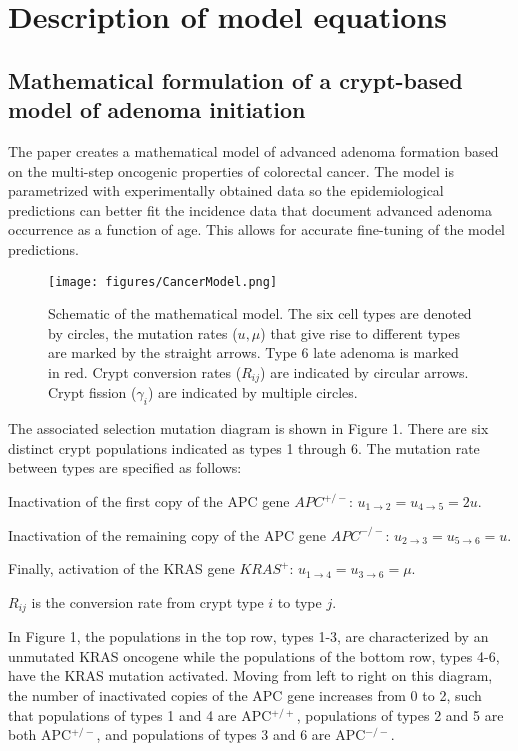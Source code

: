 \section{Description of model equations}

\subsection{Mathematical formulation of a crypt-based model of adenoma initiation}

The paper creates a mathematical model of advanced adenoma formation based on the multi-step oncogenic properties of colorectal cancer. The model is parametrized with experimentally obtained data so the epidemiological predictions can better fit the incidence data that document advanced adenoma occurrence as a function of age. This allows for accurate fine-tuning of the model predictions. 

\begin{figure}[h]
    \centering
    \texttt{[image: figures/CancerModel.png]}
    \caption{Schematic of the mathematical model. The six cell types are denoted by circles, the mutation rates ($u, \mu$) that give rise to different types are marked by the straight arrows. Type 6 late adenoma is marked in red. Crypt conversion rates ($R_{ij}$) are indicated by circular arrows. Crypt fission ($\gamma_i$) are indicated by multiple circles.}
    \label{fig:A schematic illustrating the mathematical model}
\end{figure}

The associated selection mutation diagram is shown in Figure 1. There are six distinct crypt populations indicated as types 1 through 6.  
The mutation rate between types are specified as follows:

Inactivation of the first copy of the APC gene \( APC^{+/-} \): 
\( u_{1 \to 2} = u_{4 \to 5} = 2u \).

Inactivation of the remaining copy of the APC gene \( APC^{-/-} \): 
\( u_{2 \to 3} = u_{5 \to 6} = u \).

Finally, activation of the KRAS gene \( KRAS^{+} \): 
\( u_{1 \to 4} = u_{3 \to 6} = \mu \).

\( R_{ij} \) is the conversion rate from crypt type \( i \) to type \( j \).

In Figure 1, the populations in the top row, types 1-3, are characterized by an unmutated KRAS oncogene while the populations of the bottom row, types 4-6, have the KRAS mutation activated. Moving from left to right on this diagram, the number of inactivated copies of the APC gene increases from 0 to 2, such that populations of types 1 and 4 are APC$^{+/+}$, populations of types 2 and 5 are both APC$^{+/-}$, and populations of types 3 and 6 are APC$^{-/-}$.


